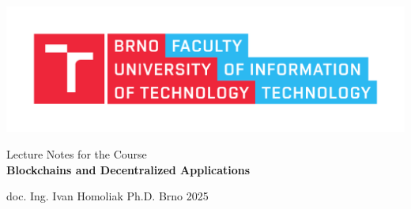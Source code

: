 \thispagestyle{empty}

\includegraphics[width=150mm]{figs/FIT_color_CMYK_EN.pdf}
{\selectfont


\vspace{5cm}


\begin{center}
  {\large Lecture Notes for the Course}      \\[10mm]
  {\LARGE \bf Blockchains and Decentralized Applications}    
  
\end{center}                                            
 
 \vfill
                 
\large doc. Ing. Ivan Homoliak  Ph.D.                                   
  \hfill  Brno 2025                                  


}

\thispagestyle{empty}

\eject

\thispagestyle{empty}

\ \\

